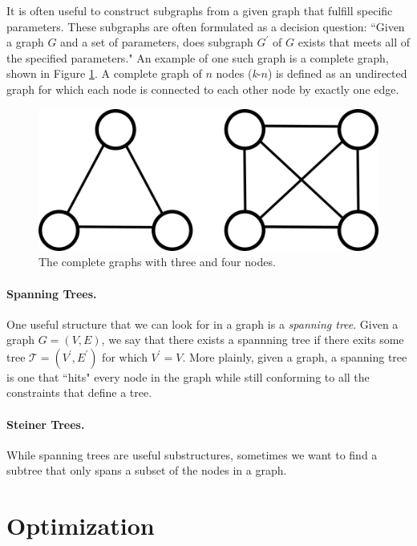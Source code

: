 \documentclass[12pt,twoside]{reedthesis}
\theoremstyle{definition}
\begin{document}
   It is often useful to construct subgraphs from a given graph that fulfill specific parameters. These subgraphs are often formulated as a decision question: ``Given a graph $G$ and a set of parameters, does subgraph $G^\prime$ of $G$ exists that meets all of the specified parameters." An example of one such graph is a complete graph, shown in Figure \ref{fig:complete_graphs}. A complete graph of $n$ nodes (\textit{k}-$n$) is defined as an undirected graph for which each node is connected to each other node by exactly one edge.

   \begin{figure}[!h]
     \begin{center}
       \includegraphics[width=\textwidth/2]{complete_graphs}
     \caption[Complete Graphs \textit{k}-3 and \textit{k}-4.]{The complete graphs with three and four nodes.}
     \label{fig:complete_graphs}
     \end{center}
   \end{figure}

   \paragraph{Spanning Trees.}One useful structure that we can look for in a graph is a \textit{spanning tree}. Given a graph $G=(V,E)$, we say that there exists a spannning tree if there exits some tree $\mathcal{T}=(V^\prime,E^\prime)$ for which $V^\prime = V$.  More plainly, given a graph, a spanning tree is one that ``hits" every node in the graph while still conforming to all the constraints that define a tree.

   \paragraph{Steiner Trees.}While spanning trees are useful substructures, sometimes we want to find a subtree that only spans a subset of the nodes in a graph.

 \section{Optimization}
\end{document}
